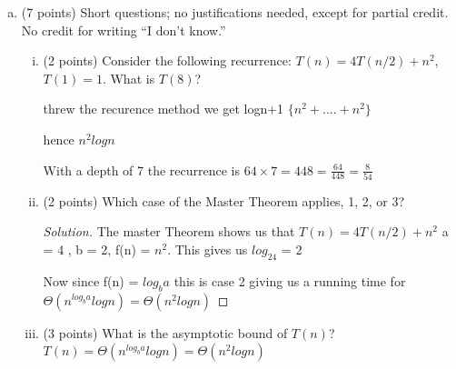 \documentclass[12pt]{amsart}
\begin{document}
\begin{enumerate}[(a)]
\item (7 points)
Short questions; no justifications needed, except for partial credit. No credit for writing  ``I don't know.'' 
\begin{enumerate}[(i)] 
\item (2 points)
Consider the following recurrence: $T(n) = 4T(n/2) + n^2$, $T(1) = 1$. What is $T(8)$?

threw the recurence method we get logn+1 $\{ n^2 +....+ n^2 \}$

hence $n^2logn$ 

With a depth of 7 the recurrence is $64\times 7 = 448 = \frac{64}{448}= \frac{8}{54}$

\vfill

\item (2 points)
Which case of the Master Theorem applies, 1, 2, or 3?\\
\begin{proof}[Solution]
The master Theorem shows us that $T(n) = 4T(n/2) + n^2$
a = 4 , b = 2, f(n) = $n^2$. This gives us $log_24$ =  2

Now since f(n) = $log_ba$ this is case 2 giving us a running time for $\Theta (n^{log_ba}logn) = \Theta(n^2logn)$

\end{proof}


 \vfill

\item (3 points)
What is the asymptotic bound of $T(n)$?\\
$T(n) = \Theta (n^{log_ba}logn) = \Theta(n^2logn)$
\vfill

\end{enumerate}

\newpage


\end{enumerate}
\end{document}
